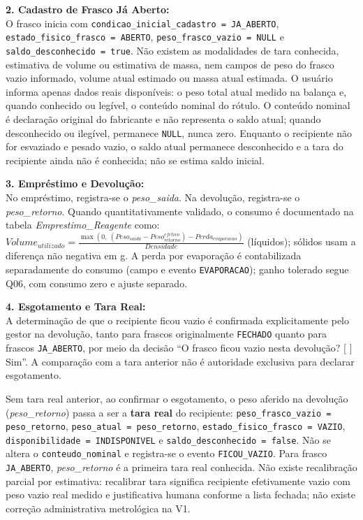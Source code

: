 \begin{regra}
\textbf{2. Cadastro de Frasco Já Aberto:}\\
O frasco inicia com \texttt{condicao\_inicial\_cadastro = JA\_ABERTO}, \texttt{estado\_fisico\_frasco = ABERTO}, \texttt{peso\_frasco\_vazio = NULL} e \texttt{saldo\_desconhecido = true}. Não existem as modalidades de tara conhecida, estimativa de volume ou estimativa de massa, nem campos de peso do frasco vazio informado, volume atual estimado ou massa atual estimada. O usuário informa apenas dados reais disponíveis: o peso total atual medido na balança e, quando conhecido ou legível, o conteúdo nominal do rótulo. O conteúdo nominal é declaração original do fabricante e não representa o saldo atual; quando desconhecido ou ilegível, permanece \texttt{NULL}, nunca zero. Enquanto o recipiente não for esvaziado e pesado vazio, o saldo atual permanece desconhecido e a tara do recipiente ainda não é conhecida; não se estima saldo inicial.

\textbf{3. Empréstimo e Devolução:}\\
No empréstimo, registra-se o \textit{peso\_saida}. Na devolução, registra-se o \textit{peso\_retorno}. Quando quantitativamente validado, o consumo é documentado na tabela \textit{Emprestimo\_Reagente} como: $Volume_{utilizado} = \frac{\max(0,\ (Peso_{saida} - Peso_{retorno}^{efetivo}) - Perda_{evaporacao})}{Densidade}$ (líquidos); sólidos usam a diferença não negativa em g. A perda por evaporação é contabilizada separadamente do consumo (campo e evento \texttt{EVAPORACAO}); ganho tolerado segue Q06, com consumo zero e ajuste separado.

\textbf{4. Esgotamento e Tara Real:}\\
A determinação de que o recipiente ficou vazio é confirmada explicitamente pelo gestor na devolução, tanto para frascos originalmente \texttt{FECHADO} quanto para frascos \texttt{JA\_ABERTO}, por meio da decisão ``O frasco ficou vazio nesta devolução? [ ] Sim''. A comparação com a tara anterior não é autoridade exclusiva para declarar esgotamento.

Sem tara real anterior, ao confirmar o esgotamento, o peso aferido na devolução (\textit{peso\_retorno}) passa a ser a \textbf{tara real} do recipiente: \texttt{peso\_frasco\_vazio = peso\_retorno}, \texttt{peso\_atual = peso\_retorno}, \texttt{estado\_fisico\_frasco = VAZIO}, \texttt{disponibilidade = INDISPONIVEL} e \texttt{saldo\_desconhecido = false}. Não se altera o \texttt{conteudo\_nominal} e registra-se o evento \texttt{FICOU\_VAZIO}. Para frasco \texttt{JA\_ABERTO}, \textit{peso\_retorno} é a primeira tara real conhecida. Não existe recalibração parcial por estimativa: recalibrar tara significa recipiente efetivamente vazio com peso vazio real medido e justificativa humana conforme a lista fechada; não existe correção administrativa metrológica na V1.


\end{regra}
